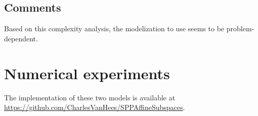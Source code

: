 \documentclass[a4paper, 12pt]{article}
\begin{document}
\subsection{Comments}
Based on this complexity analysis, the modelization to use seems to be problem-dependent.

\section{Numerical experiments}\label{sec:experiments}
The implementation of these two models is available at \url{https://github.com/CharlesVanHees/SPPAffineSubspaces}.

\printbibliography{}
\end{document}
